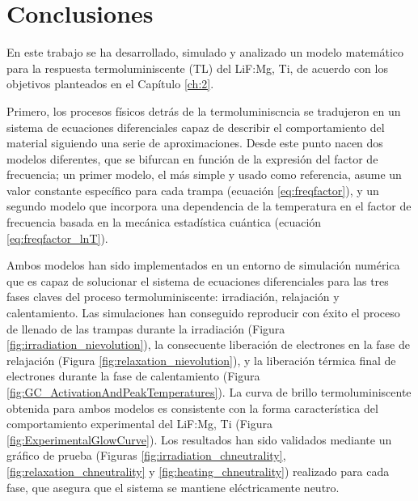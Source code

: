 \chapter*{Conclusiones}

En este trabajo se ha desarrollado, simulado y analizado un modelo matemático para la respuesta termoluminiscente (TL) del LiF:Mg, Ti, de acuerdo con los objetivos planteados en el Capítulo \ref{ch:2}.

\vspace{10pt}

Primero, los procesos físicos detrás de la termoluminiscncia se tradujeron en un sistema de ecuaciones diferenciales capaz de describir el comportamiento del material siguiendo una serie de aproximaciones. Desde este punto nacen dos modelos diferentes, que se bifurcan en función de la expresión del factor de frecuencia; un primer modelo, el más simple y usado como referencia, asume un valor constante específico para cada trampa (ecuación \ref{eq:freqfactor}), y un segundo modelo que incorpora una dependencia de la temperatura en el factor de frecuencia basada en la mecánica estadística cuántica (ecuación \ref{eq:freqfactor_lnT}).

\vspace{10pt}

Ambos modelos han sido implementados en un entorno de simulación numérica que es capaz de solucionar el sistema de ecuaciones diferenciales para las tres fases claves del proceso termoluminiscente: irradiación, relajación y calentamiento. Las simulaciones han conseguido reproducir con éxito el proceso de llenado de las trampas durante la irradiación (Figura \ref{fig:irradiation_nievolution}), la consecuente liberación de electrones en la fase de relajación (Figura \ref{fig:relaxation_nievolution}), y la liberación térmica final de electrones durante la fase de calentamiento (Figura \ref{fig:GC_ActivationAndPeakTemperatures}). La curva de brillo termoluminiscente obtenida para ambos modelos es consistente con la forma característica del comportamiento experimental del LiF:Mg, Ti (Figura \ref{fig:ExperimentalGlowCurve}). Los resultados han sido validados mediante un gráfico de prueba (Figuras \ref{fig:irradiation_chneutrality}, \ref{fig:relaxation_chneutrality} y \ref{fig:heating_chneutrality}) realizado para cada fase, que asegura que el sistema se mantiene eléctricamente neutro.

\vspace{10pt}

